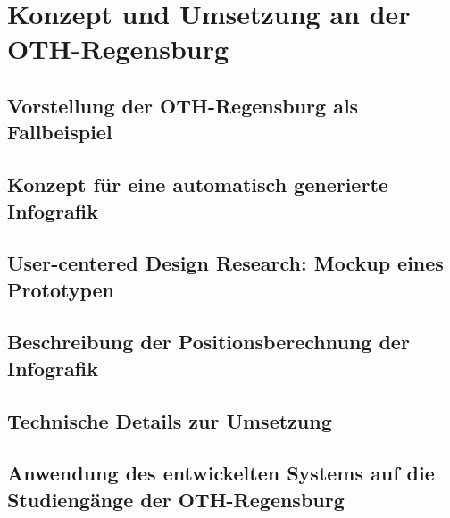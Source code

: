\section{Konzept und Umsetzung an der OTH-Regensburg}

\subsection{Vorstellung der OTH-Regensburg als Fallbeispiel}

\subsection{Konzept für eine automatisch generierte Infografik}

\subsection{User-centered Design Research: Mockup eines Prototypen}

\subsection{Beschreibung der Positionsberechnung der Infografik}

\subsection{Technische Details zur Umsetzung}

\subsection{Anwendung des entwickelten Systems auf die Studiengänge der OTH-Regensburg}